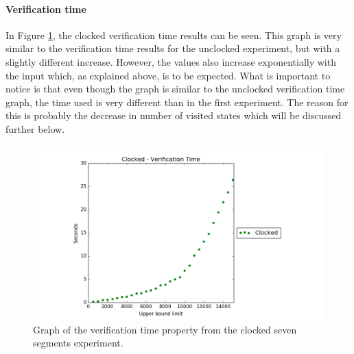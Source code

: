 \paragraph{Verification time}
In Figure \ref{fig:clocked_verification}, the clocked verification time
results can be seen.
This graph is very similar to the verification time results for the unclocked experiment, but with a slightly different increase. However, the values also increase exponentially with the input which, as explained above, is to be expected. What is important to notice is that even though the graph is similar to the unclocked verification time graph, the time used is very different than in the first experiment. The reason for this is probably the decrease in number of visited states which will be discussed further below.
\begin{figure}
    \centering
    \includegraphics[scale=0.6]{./figures/plots/clocked_verification_time.png}
\caption{Graph of the verification time property from the clocked seven segments experiment.}
\label{fig:clocked_verification}
\end{figure}
